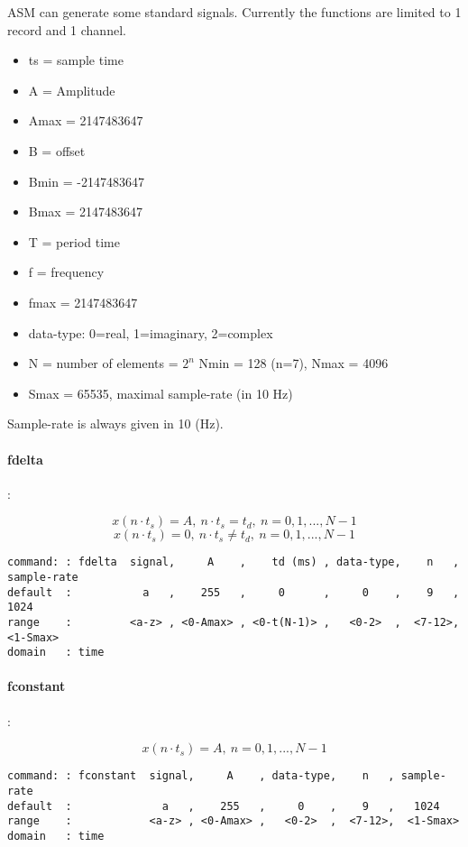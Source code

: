 \documentclass{report}
\newcommand{\bc}{\scriptsize}
\newcommand{\ec}{\normalsize}
\begin{document}
ASM can generate some standard signals.
Currently the functions are limited to 1 record and 1 channel.

\begin{itemize}
\item ts = sample time
\item A = Amplitude
\item Amax = 2147483647
\item B = offset
\item Bmin = -2147483647
\item Bmax = 2147483647
\item T = period time
\item f = frequency
\item fmax = 2147483647
\item data-type: 0=real, 1=imaginary, 2=complex
\item N = number of elements = $2^{n}$
Nmin = 128 (n=7), Nmax = 4096
\item Smax = 65535, maximal sample-rate (in 10 Hz)
\end{itemize}

Sample-rate is always given in 10 (Hz).

\paragraph{fdelta}:

\[ x(n \cdot t_{s}) = A,~ n \cdot t_{s} = t_{d},~ n=0,1,...,N-1 \]
\[ x(n \cdot t_{s}) = 0,~ n \cdot t_{s} \neq t_{d},~ n=0,1,...,N-1 \]

\bc
\begin{verbatim}
command: : fdelta  signal,     A    ,    td (ms) , data-type,    n   , sample-rate
default  :           a   ,    255   ,     0      ,     0    ,    9   ,   1024
range    :         <a-z> , <0-Amax> , <0-t(N-1)> ,   <0-2>  ,  <7-12>,  <1-Smax>
domain   : time
\end{verbatim}
\ec

\paragraph{fconstant}:

\[ x(n \cdot t_{s}) = A,~ n=0,1,...,N-1 \]
\bc
\begin{verbatim}
command: : fconstant  signal,     A    , data-type,    n   , sample-rate
default  :              a   ,    255   ,     0    ,    9   ,   1024
range    :            <a-z> , <0-Amax> ,   <0-2>  ,  <7-12>,  <1-Smax>
domain   : time
\end{verbatim}
\ec
\end{document}
